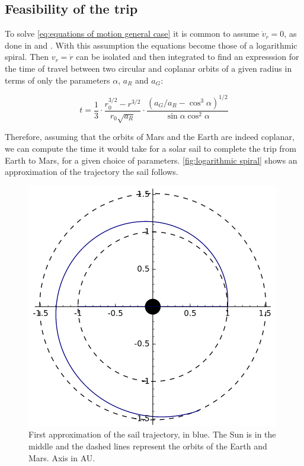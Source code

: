 \documentclass[twocolumn,12pt,a4paper]{article}
\numberwithin{equation}{section}
\begin{document}
\subsection{Feasibility of the trip} \label{sec:Feasibility of the trip}
To solve \autoref{eq:equations of motion general case} it is common to assume \( \dot{v}_r = 0\), as done in \cite{tsu} and \cite{mcinnes}. With this assumption the equations become those of a logarithmic spiral. Then \( v_r = \dot{r} \) can be isolated and then integrated to find an expresssion for the time of travel between two circular and coplanar orbits of a given radius in terms of only the parameters \( \alpha \), \( a_R \) and \( a_G \):

\begin{equation} \label{eq:time of flight between orbits}
	t=\frac{1}{3}\cdot\frac{r_0^{3/2}-r^{3/2}}{r_0\sqrt{a_R}}\cdot\frac{(a_G/a_R-\cos^3\alpha)^{1/2}}{\sin\alpha\cos^2\alpha}
\end{equation}

Therefore, assuming that the orbits of Mars and the Earth are indeed coplanar, we can compute the time it would take for a solar sail to complete the trip from Earth to Mars, for a given choice of parameters. \autoref{fig:logarithmic spiral} shows an approximation of the trajectory the sail follows.

\begin{figure}
	\centering
	\includegraphics[scale=0.5]{espiral.png}
	\caption{First approximation of the sail trajectory, in blue. The Sun is in the middle and the dashed lines represent the orbits of the Earth and Mars. Axis in AU.}
	\label{fig:logarithmic spiral}
\end{figure}
\end{document}
